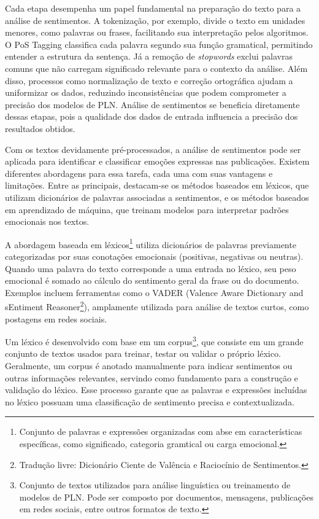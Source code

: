 \documentclass[
	12pt,				%
	oneside,			%
	a4paper,			%
	english,			%
	french,				%
	spanish,			%
	brazil				%
	]{abntex2}
\begin{document}
Cada etapa desempenha um papel fundamental na preparação do texto para a
análise de sentimentos. A tokenização, por exemplo, divide o texto em
unidades menores, como palavras ou frases, facilitando sua interpretação
pelos algoritmos. O PoS Tagging classifica cada palavra segundo sua
função gramatical, permitindo entender a estrutura da sentença. Já a
remoção de \emph{stopwords} exclui palavras comuns que não carregam
significado relevante para o contexto da análise. Além disso, processos
como normalização de texto e correção ortográfica ajudam a uniformizar
os dados, reduzindo inconsistências que podem comprometer a precisão dos
modelos de PLN. Análise de sentimentos se beneficia diretamente dessas
etapas, pois a qualidade dos dados de entrada influencia a precisão dos
resultados obtidos.

Com os textos devidamente pré-processados, a análise de sentimentos pode
ser aplicada para identificar e classificar emoções expressas nas
publicações. Existem diferentes abordagens para essa tarefa, cada uma
com suas vantagens e limitações. Entre as principais, destacam-se os
métodos baseados em léxicos, que utilizam dicionários de palavras
associadas a sentimentos, e os métodos baseados em aprendizado de
máquina, que treinam modelos para interpretar padrões emocionais nos
textos.

A abordagem baseada em léxicos\footnote{Conjunto de palavras e
  expressões organizadas com abse em características específicas, como
  significado, categoria gramtical ou carga emocional.} utiliza
dicionários de palavras previamente categorizadas por suas conotações
emocionais (positivas, negativas ou neutras). Quando uma palavra do
texto corresponde a uma entrada no léxico, seu peso emocional é somado
ao cálculo do sentimento geral da frase ou do documento. Exemplos
incluem ferramentas como o VADER (Valence Aware Dictionary and sEntiment
Reasoner\footnote{Tradução livre: Dicionário Ciente de Valência e
  Raciocínio de Sentimentos.}), amplamente utilizada para análise de
textos curtos, como postagens em redes sociais.

Um léxico é desenvolvido com base em um corpus\footnote{Conjunto de
  textos utilizados para análise linguística ou treinamento de modelos
  de PLN. Pode ser composto por documentos, mensagens, publicações em
  redes sociais, entre outros formatos de texto.}, que consiste em um
grande conjunto de textos usados para treinar, testar ou validar o
próprio léxico. Geralmente, um corpus é anotado manualmente para indicar
sentimentos ou outras informações relevantes, servindo como fundamento
para a construção e validação do léxico. Esse processo garante que as
palavras e expressões incluídas no léxico possuam uma classificação de
sentimento precisa e contextualizada.
\end{document}
